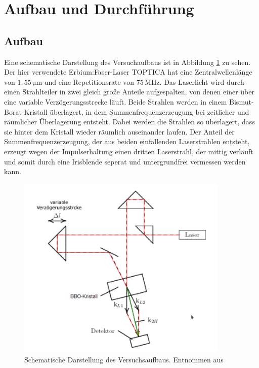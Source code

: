 \newpage
\section{Aufbau und Durchführung}
\subsection{Aufbau}
Eine schematische Darstellung des Versuchaufbaus ist in Abbildung \ref{fig:Aufbau} zu sehen.
Der hier verwendete Erbium:Faser-Laser TOPTICA hat eine Zentralwellenlänge von $1,55\,\si{\micro\meter}$ und eine Repetitionsrate von $75\,\si{\mega\hertz}$.
Das Laserlicht wird durch einen Strahlteiler in zwei gleich große Anteile aufgespalten, von denen einer über eine variable Verzögerungsstrecke läuft.
Beide Strahlen werden in einem Bismut-Borat-Kristall überlagert, in dem Summenfrequenzerzeugung bei zeitlicher und räumlicher Überlagerung entsteht.
Dabei werden die Strahlen so überlagert, dass sie hinter dem Kristall wieder räumlich auseinander laufen.
Der Anteil der Summenfrequenzerzeugung, der aus beiden einfallenden Laserstrahlen entsteht, erzeugt wegen der Impulserhaltung einen dritten Laserstrahl, der mittig verläuft und 
somit durch eine Irisblende seperat und untergrundfrei vermessen werden kann.
 
\begin{figure}[H]
    \centering\captionsetup{format=plain}
    \includegraphics[width=0.9\textwidth]{bilder/Aufbau.png}
    \caption{Schematische Darstellung des Versuchsaufbaus. Entnommen aus \cite{anleitung}}
    \label{fig:Aufbau}
\end{figure}

